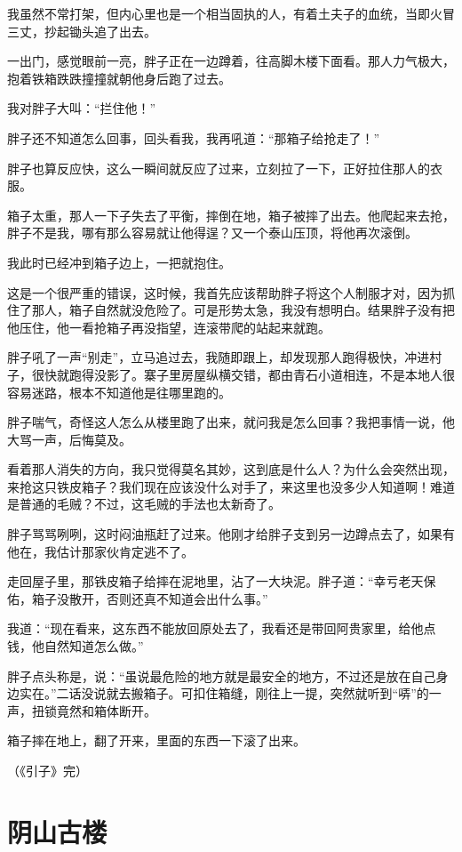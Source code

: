 我虽然不常打架，但内心里也是一个相当固执的人，有着土夫子的血统，当即火冒三丈，抄起锄头追了出去。

一出门，感觉眼前一亮，胖子正在一边蹲着，往高脚木楼下面看。那人力气极大，抱着铁箱跌跌撞撞就朝他身后跑了过去。

我对胖子大叫：“拦住他！”

胖子还不知道怎么回事，回头看我，我再吼道：“那箱子给抢走了！”

胖子也算反应快，这么一瞬间就反应了过来，立刻拉了一下，正好拉住那人的衣服。

箱子太重，那人一下子失去了平衡，摔倒在地，箱子被摔了出去。他爬起来去抢，胖子不是我，哪有那么容易就让他得逞？又一个泰山压顶，将他再次滚倒。

我此时已经冲到箱子边上，一把就抱住。

这是一个很严重的错误，这时候，我首先应该帮助胖子将这个人制服才对，因为抓住了那人，箱子自然就没危险了。可是形势太急，我没有想明白。结果胖子没有把他压住，他一看抢箱子再没指望，连滚带爬的站起来就跑。

胖子吼了一声“别走”，立马追过去，我随即跟上，却发现那人跑得极快，冲进村子，很快就跑得没影了。寨子里房屋纵横交错，都由青石小道相连，不是本地人很容易迷路，根本不知道他是往哪里跑的。

胖子喘气，奇怪这人怎么从楼里跑了出来，就问我是怎么回事？我把事情一说，他大骂一声，后悔莫及。

看着那人消失的方向，我只觉得莫名其妙，这到底是什么人？为什么会突然出现，来抢这只铁皮箱子？我们现在应该没什么对手了，来这里也没多少人知道啊！难道是普通的毛贼？不过，这毛贼的手法也太新奇了。

胖子骂骂咧咧，这时闷油瓶赶了过来。他刚才给胖子支到另一边蹲点去了，如果有他在，我估计那家伙肯定逃不了。

走回屋子里，那铁皮箱子给摔在泥地里，沾了一大块泥。胖子道：“幸亏老天保佑，箱子没散开，否则还真不知道会出什么事。”

我道：“现在看来，这东西不能放回原处去了，我看还是带回阿贵家里，给他点钱，他自然知道怎么做。”

胖子点头称是，说：“虽说最危险的地方就是最安全的地方，不过还是放在自己身边实在。”二话没说就去搬箱子。可扣住箱缝，刚往上一提，突然就听到“哢”的一声，扭锁竟然和箱体断开。

箱子摔在地上，翻了开来，里面的东西一下滚了出来。

{\fzqiti\hfill （《引子》完）}

\part{阴山古楼 }
